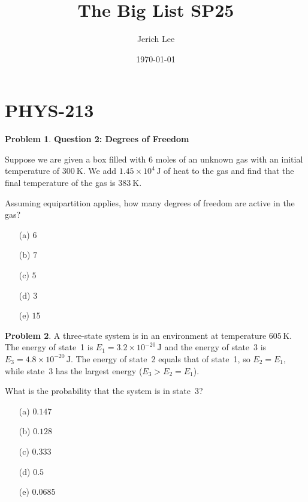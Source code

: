 \documentclass[10pt]{article}
\title{The Big List SP25}
\author{Jerich Lee}
\date{\today}
\theoremstyle{definition} %
\newtheorem{problem}{Problem}
\theoremstyle{plain} %
\begin{document}
\maketitle
\section{PHYS-213}
\begin{problem}
  \textbf{Question 2: Degrees of Freedom}
  
  Suppose we are given a box filled with $6$ moles of an unknown gas with an initial
  temperature of $300~\text{K}$. We add $1.45\times10^{4}\,\text{J}$ of heat to the gas
  and find that the final temperature of the gas is $383~\text{K}$.
  
  \medskip
  Assuming equipartition applies, how many degrees of freedom are active in the gas?
  
  \begin{enumerate}
    \item[(a)] $6$
    \item[(b)] $7$
    \item[(c)] $5$
    \item[(d)] $3$
    \item[(e)] $15$
  \end{enumerate}
  \end{problem}
\begin{problem}
  A three-state system is in an environment at temperature
  $605\,\text{K}$.  
  The energy of state~1 is $E_{1}=3.2\times10^{-20}\,\text{J}$ and the
  energy of state~3 is $E_{3}=4.8\times10^{-20}\,\text{J}$.  
  The energy of state~2 equals that of state~1, so $E_{2}=E_{1}$, while
  state~3 has the largest energy ($E_{3}>E_{2}=E_{1}$).
  
  \medskip
  What is the probability that the system is in state~3?
  
  \begin{enumerate}
    \item[(a)] $0.147$
    \item[(b)] $0.128$
    \item[(c)] $0.333$
    \item[(d)] $0.5$
    \item[(e)] $0.0685$
  \end{enumerate}
  \end{problem}
  
\end{document}
